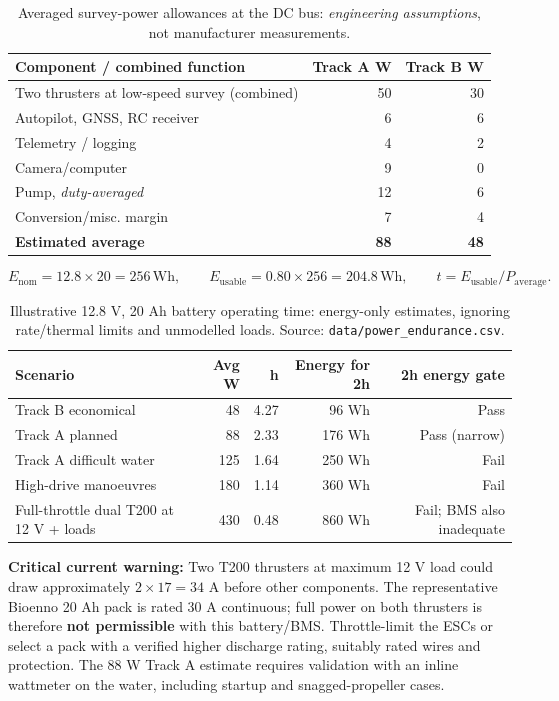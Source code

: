\documentclass[10pt,a4paper]{article}
\begin{document}
\begin{table}[H]\centering\footnotesize
\caption{Averaged survey-power allowances at the DC bus: \emph{engineering assumptions}, not manufacturer measurements.}
\begin{tabularx}{\linewidth}{@{}Yrr@{}}\toprule
Component / combined function & Track A W & Track B W\\\midrule
Two thrusters at low-speed survey (combined) & 50 & 30\\
Autopilot, GNSS, RC receiver & 6 & 6\\
Telemetry / logging & 4 & 2\\
Camera/computer & 9 & 0\\
Pump, \emph{duty-averaged} & 12 & 6\\
Conversion/misc. margin & 7 & 4\\\midrule
\textbf{Estimated average} & \textbf{88} & \textbf{48}\\\bottomrule\end{tabularx}\end{table}
\[E_{\mathrm{nom}}=12.8\times20=256\,\mathrm{Wh},\qquad E_{\mathrm{usable}}=0.80\times256=204.8\,\mathrm{Wh},\qquad t=E_{\mathrm{usable}}/P_{\mathrm{average}}.\]
\begin{table}[H]\centering\footnotesize
\caption{Illustrative 12.8 V, 20 Ah battery operating time: energy-only estimates, ignoring rate/thermal limits and unmodelled loads. Source: \texttt{data/power\_endurance.csv}.}
\begin{tabularx}{\linewidth}{@{}Yrrrr@{}}\toprule
Scenario & Avg W & h & Energy for 2h & 2h energy gate\\\midrule
Track B economical & 48 & 4.27 & 96 Wh & Pass\\
Track A planned & 88 & 2.33 & 176 Wh & Pass (narrow)\\
Track A difficult water & 125 & 1.64 & 250 Wh & Fail\\
High-drive manoeuvres & 180 & 1.14 & 360 Wh & Fail\\
Full-throttle dual T200 at 12 V + loads & 430 & 0.48 & 860 Wh & Fail; BMS also inadequate\\\bottomrule\end{tabularx}\end{table}
\textbf{Critical current warning:} Two T200 thrusters at maximum 12 V load could draw approximately $2\times17=34$ A before other components. The representative Bioenno 20 Ah pack is rated 30 A continuous; full power on both thrusters is therefore \textbf{not permissible} with this battery/BMS. Throttle-limit the ESCs or select a pack with a verified higher discharge rating, suitably rated wires and protection. The $88$ W Track A estimate requires validation with an inline wattmeter on the water, including startup and snagged-propeller cases. \cite{T200,Bioenno}
\end{document}
